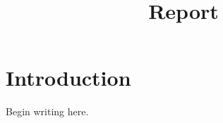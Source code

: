 \documentclass{report}
\title{Report}
\author{}
\date{}
\begin{document}
\maketitle
\chapter{Introduction}
Begin writing here.
\end{document}
